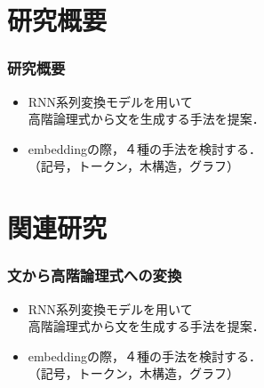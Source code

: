 \documentclass[dvipdfmx]{beamer}
\begin{document}
\section{研究概要}
\begin{frame}
\frametitle{研究概要}
\begin{center}
\end{center}

\begin{itemize}
  \item RNN系列変換モデルを用いて\\高階論理式から文を生成する手法を提案．
  \item embeddingの際，４種の手法を検討する．\\（記号，トークン，木構造，グラフ）　
\end{itemize}


\end{frame}


\section{関連研究}
\begin{frame}
\frametitle{文から高階論理式への変換}
\begin{center}
\end{center}

\begin{itemize}
  \item RNN系列変換モデルを用いて\\{\color{berry}高階論理式}から文を生成する手法を提案．
  \item embeddingの際，４種の手法を検討する．\\（記号，トークン，木構造，グラフ）　
\end{itemize}

\end{frame}
\end{document}
